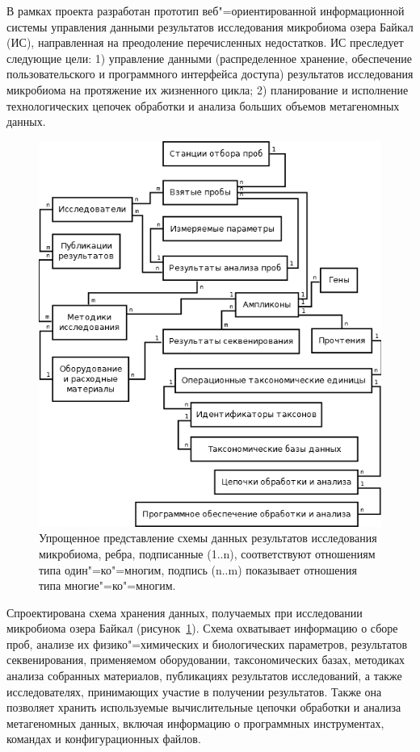 \documentclass[a4paper,12pt,openany,final]{extreport}
\def\oldcaption{} \let\oldcaption=\caption
\def\caption{\stepcounter{captionsnum}\oldcaption}
\begin{document}
В рамках проекта разработан прототип веб"=ориентированной информационной системы управления данными результатов исследования микробиома озера Байкал (ИС), направленная на преодоление перечисленных недостатков. ИС преследует следующие цели: 1) управление данными (распределенное хранение, обеспечение пользовательского и программного интерфейса доступа) результатов исследования микробиома на протяжение их жизненного цикла; 2) планирование и исполнение технологических цепочек обработки и анализа больших объемов метагеномных данных.

\begin{figure}\centering
\includegraphics[width=0.9\linewidth]{media/image15.png}

\caption{Упрощенное представление схемы данных результатов исследования микробиома, ребра, подписанные (1..n), соответствуют отношениям типа один"=ко"=многим, подпись (n..m) показывает отношения типа многие"=ко"=многим.}\label{fig:schemabd}
\end{figure}

Спроектирована схема хранения данных, получаемых при исследовании микробиома озера Байкал (рисунок~\ref{fig:schemabd}). Схема охватывает информацию о сборе проб, анализе их физико"=химических и биологических параметров, результатов секвенирования, применяемом оборудовании, таксономических базах, методиках анализа собранных материалов, публикациях результатов исследований, а также исследователях, принимающих участие в получении результатов. Также она позволяет хранить используемые вычислительные цепочки обработки и анализа метагеномных данных, включая информацию о программных инструментах, командах и конфигурационных файлов.
\end{document}

